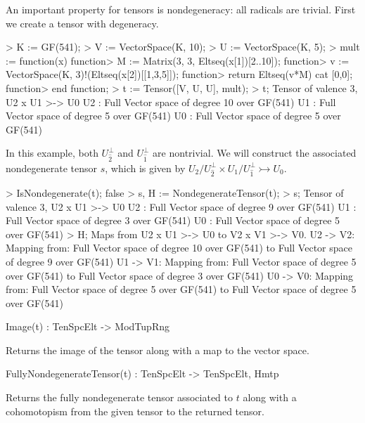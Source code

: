 \begin{example}[Nondegeneracy]

An important property for tensors is nondegeneracy: all radicals are trivial.
First we create a tensor with degeneracy.
\begin{code}
> K := GF(541);
> V := VectorSpace(K, 10);
> U := VectorSpace(K, 5);
> mult := function(x)
function>   M := Matrix(3, 3, Eltseq(x[1])[2..10]);
function>   v := VectorSpace(K, 3)!(Eltseq(x[2])[[1,3,5]]);
function>   return Eltseq(v*M) cat [0,0];
function> end function;
> t := Tensor([V, U, U], mult);
> t;
Tensor of valence 3, U2 x U1 >-> U0
U2 : Full Vector space of degree 10 over GF(541)
U1 : Full Vector space of degree 5 over GF(541)
U0 : Full Vector space of degree 5 over GF(541)
\end{code}

In this example, both $U_{\widehat{2}}^\perp$ and $U_{\widehat{1}}^\perp$ are
nontrivial. We will construct the associated nondegenerate tensor $s$, which is
given by $U_2/U_{\widehat{2}}^\perp \times U_1/U_{\widehat{1}}^\perp
\rightarrowtail U_0$. 
\begin{code}
> IsNondegenerate(t);
false
> s, H := NondegenerateTensor(t);
> s;
Tensor of valence 3, U2 x U1 >-> U0
U2 : Full Vector space of degree 9 over GF(541)
U1 : Full Vector space of degree 3 over GF(541)
U0 : Full Vector space of degree 5 over GF(541)
> H;
Maps from U2 x U1 >-> U0 to V2 x V1 >-> V0.
U2 -> V2: Mapping from: Full Vector space of degree 10 over GF(541) to 
Full Vector space of degree 9 over GF(541)
U1 -> V1: Mapping from: Full Vector space of degree 5 over GF(541) to 
Full Vector space of degree 3 over GF(541)
U0 -> V0: Mapping from: Full Vector space of degree 5 over GF(541) to 
Full Vector space of degree 5 over GF(541)
\end{code}
\end{example}

\begin{intrinsics}
Image(t) : TenSpcElt -> ModTupRng
\end{intrinsics}

Returns the image of the tensor along with a map to the vector space.

\begin{intrinsics}
FullyNondegenerateTensor(t) : TenSpcElt -> TenSpcElt, Hmtp
\end{intrinsics}

Returns the fully nondegenerate tensor associated to $t$ along with a
cohomotopism from the given tensor to the returned tensor.

